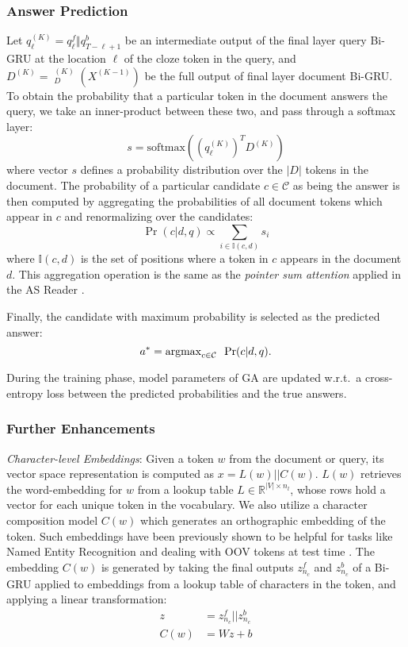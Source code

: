 \documentclass[11pt,a4paper]{article}
\DeclareMathOperator{\bigru}{\overset{\longleftrightarrow}{\mathrm{GRU}}}
\begin{document}
\subsubsection{Answer Prediction}
Let $q^{(K)}_\ell = q_\ell^f\Vert q^b_{T-\ell+1}$ be an intermediate output of the final layer query Bi-GRU at the location $\ell$ of the cloze token in the query,
and $D^{(K)} = \bigru^{(K)}_D(X^{(K-1)})$ be the full output of final layer document Bi-GRU. To obtain the probability that a particular token in the document answers the query, we take an inner-product between these two, and pass through a softmax layer:
\begin{equation}
\label{eq:att}
s = \text{softmax}((q^{(K)}_\ell)^T D^{(K)})
\end{equation}
where vector $s$ defines a probability distribution over the $|D|$ tokens in the document. The probability of a particular candidate $c \in \mathcal{C}$ as being the answer is then computed by aggregating the probabilities of all document tokens which appear in $c$ and renormalizing over the candidates:
\begin{equation}
    \Pr(c|d,q) \propto \sum_{i\in \mathbb{I}(c,d)} s_i
\end{equation}
where $\mathbb{I}(c,d)$ is the set of positions where a token in $c$ appears in the document $d$. This aggregation operation is the same as the \textit{pointer sum attention} applied in the AS Reader \citep{kadlec2016text}.

Finally, the candidate with maximum probability is selected as the predicted answer:
\begin{equation}
    a^* = \mathrm{argmax}_{c \in \mathcal{C}} \enskip \Pr(c|d,q).
\end{equation}

During the training phase,
model parameters of GA are updated w.r.t.\ a cross-entropy loss between the predicted probabilities and the true answers.


\subsubsection{Further Enhancements}
\label{sec:tricks}
\emph{Character-level Embeddings}: Given a token $w$ from the document or query, its vector space representation is computed as $x=L(w) || C(w)$. $L(w)$ retrieves the word-embedding for $w$ from a lookup table $L \in \mathbb{R}^{|V|\times n_l}$, whose rows hold a vector for each unique token in the vocabulary. We also utilize a character composition model $C(w)$ which generates an orthographic embedding of the token. Such embeddings have been previously shown to be helpful for tasks like Named Entity Recognition \citep{yang2016multi} and dealing with OOV tokens at test time \citep{dhingra2016tweet2vec}. The embedding $C(w)$ is generated by taking the final outputs $z^f_{n_c}$ and $z^b_{n_c}$ of a Bi-GRU applied to embeddings from a lookup table of characters in the token, and applying a linear transformation:
\begin{align*}
z &= z^f_{n_c} || z^b_{n_c}\\
C(w) &= W z + b
\end{align*}
\end{document}
